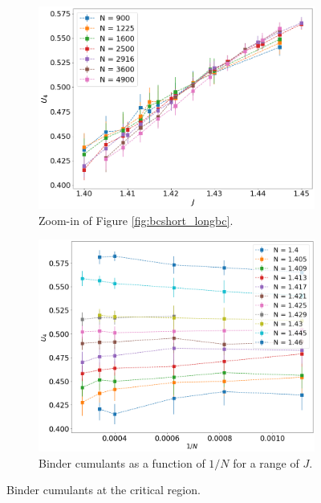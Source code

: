 \begin{figure}
	\centering
	\captionsetup{justification=centering}
	\begin{subfigure}[b]{0.45\textwidth}
		\includegraphics[width=\textwidth]{Images/bindercumulants_longchains_deep.png}
		\caption{Zoom-in of Figure \ref{fig:bcshort_longbc}.   }
		\label{fig:U4_zoomin}
	\end{subfigure}
	\begin{subfigure}[b]{0.45\textwidth}
		\includegraphics[width=\textwidth]{Images/bindercumulants_longchains_1n.png}
		\caption{Binder cumulants as a function of $1/N$ for a range of $J$. }
		\label{fig:U4_1N}
	\end{subfigure}
	\caption{ Binder cumulants at the critical region.  }
	\label{fig:U4}
\end{figure}



